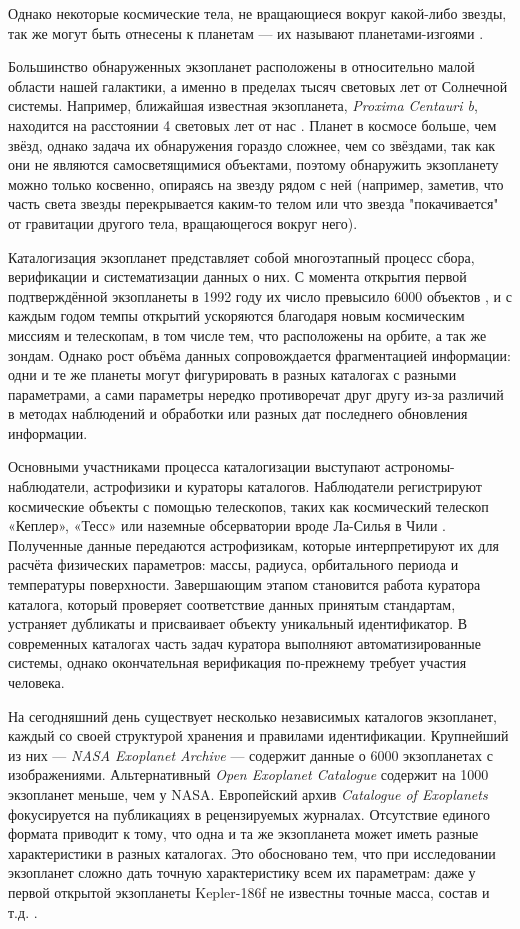 \documentclass[14pt,a4paper]{extarticle}
\begin{document}
	Однако некоторые космические тела, не вращающиеся вокруг какой-либо звезды, так же могут быть отнесены к планетам --- их называют планетами-изгоями \cite{exoplanet}.
	
	Большинство обнаруженных экзопланет расположены в относительно малой области нашей галактики, а именно в пределах тысяч световых лет от Солнечной системы. Например, ближайшая известная экзопланета, \textit{Proxima Centauri b}, находится на расстоянии 4 световых лет от нас \cite{exoDiscovery}. Планет в космосе больше, чем звёзд, однако задача их обнаружения гораздо сложнее, чем со звёздами, так как они не являются самосветящимися объектами, поэтому обнаружить экзопланету можно только косвенно, опираясь на звезду рядом с ней (например, заметив, что часть света звезды перекрывается каким-то телом или что звезда "покачивается" от гравитации другого тела, вращающегося вокруг него).
	
	Каталогизация экзопланет представляет собой многоэтапный процесс сбора, верификации и систематизации данных о них. С момента открытия первой подтверждённой экзопланеты в 1992 году их число превысило 6000 объектов \cite{exoplanet}, и с каждым годом темпы открытий ускоряются благодаря новым космическим миссиям и телескопам, в том числе тем, что расположены на орбите, а так же зондам. Однако рост объёма данных сопровождается фрагментацией информации: одни и те же планеты могут фигурировать в разных каталогах с разными параметрами, а сами параметры нередко противоречат друг другу из-за различий в методах наблюдений и обработки или разных дат последнего обновления информации.
	
	Основными участниками процесса каталогизации выступают астрономы-наблюдатели, астрофизики и кураторы каталогов. Наблюдатели регистрируют космические объекты с помощью телескопов, таких как космический телескоп «Кеплер», «Тесс» или наземные обсерватории вроде Ла-Силья в Чили \cite{lasilla}. Полученные данные передаются астрофизикам, которые интерпретируют их для расчёта физических параметров: массы, радиуса, орбитального периода и температуры поверхности. Завершающим этапом становится работа куратора каталога, который проверяет соответствие данных принятым стандартам, устраняет дубликаты и присваивает объекту уникальный идентификатор. В современных каталогах часть задач куратора выполняют автоматизированные системы, однако окончательная верификация по-прежнему требует участия человека.
	
	На сегодняшний день существует несколько независимых каталогов экзопланет, каждый со своей структурой хранения и правилами идентификации. Крупнейший из них --- \textit{NASA Exoplanet Archive} \cite{nasa-exoplanet-catalog} --- содержит данные о 6000 экзопланетах с изображениями. Альтернативный \textit{Open Exoplanet Catalogue} \cite{oec} содержит на 1000 экзопланет меньше, чем у NASA. Европейский архив \textit{Catalogue of Exoplanets} \cite{catalog-eu} фокусируется на публикациях в рецензируемых журналах. Отсутствие единого формата приводит к тому, что одна и та же экзопланета может иметь разные характеристики в разных каталогах. Это обосновано тем, что при исследовании экзопланет сложно дать точную характеристику всем их параметрам: даже у первой открытой экзопланеты Kepler-186f не известны точные масса, состав и т.д. \cite{kepler}.
	
\end{document}
